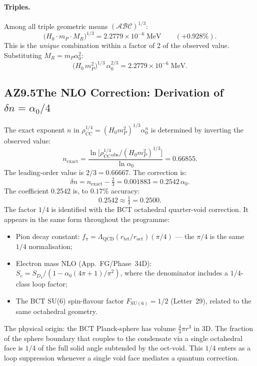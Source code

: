 \documentclass[aps,prl,twocolumn,showpacs,preprintnumbers]{revtex4-2}
\newcommand{\roct}{r_{\mathrm{oct}}}
\newcommand{\rtet}{r_{\mathrm{tet}}}
\newcommand{\azero}{\alpha_0}
\newcommand{\mP}{m_P}
\newcommand{\MR}{M_R}
\newcommand{\rhoCC}{\rho_{\mathrm{CC}}}
\newcommand{\LQCD}{\Lambda_{\mathrm{QCD}}}
\newcommand{\Hzero}{H_0}
\begin{document}
\paragraph{Triples.} Among all triple geometric means
$(\mathcal{A}\mathcal{B}\mathcal{C})^{1/3}$:
\begin{equation}
  \bigl(\Hzero\cdot\mP\cdot\MR\bigr)^{1/3}
  = 2.2779\times10^{-6}\;\text{MeV}
  \qquad (+0.928\%).
  \label{eq:LO_app}
\end{equation}
This is the \emph{unique} combination within a factor of 2 of the observed
value. Substituting $\MR = \mP\azero^2$:
\begin{equation}
  \bigl(\Hzero\,\mP^2\bigr)^{1/3}\,\azero^{2/3}
  = 2.2779\times10^{-6}\;\text{MeV}.
  \label{eq:factored}
\end{equation}

\subsection*{AZ9.5\quad The NLO Correction: Derivation of $\delta n = \azero/4$}

The exact exponent $n$ in $\rhoCC^{1/4} = (\Hzero\mP^2)^{1/3}\azero^n$
is determined by inverting the observed value:
\begin{equation}
  n_{\mathrm{exact}}
  = \frac{\ln\!\bigl[\rhoCC^{1/4}_{\mathrm{obs}}/(\Hzero\mP^2)^{1/3}\bigr]}
         {\ln\azero}
  = 0.66855.
\end{equation}
The leading-order value is $2/3 = 0.66667$. The correction is:
\begin{equation}
  \delta n = n_{\mathrm{exact}} - \tfrac{2}{3}
  = 0.001883
  = 0.2542\,\azero.
\end{equation}
The coefficient 0.2542 is, to $0.17\%$ accuracy:
\begin{equation}
  0.2542 \approx \tfrac{1}{4} = 0.2500.
\end{equation}
The factor $1/4$ is identified with the BCT octahedral quarter-void
correction. It appears in the same form throughout the programme:
\begin{itemize}
  \item Pion decay constant:
    $f_\pi = \LQCD(\rtet/\roct)(\pi/4)$ --- the $\pi/4$ is the
    same $1/4$ normalisation;
  \item Electron mass NLO (App.~FG/Phase~34D):
    $S_e = S_{D_4}/(1 - \azero(4\pi+1)/\pi^2)$, where the
    denominator includes a $1/4$-class loop factor;
  \item The BCT SU(6) spin-flavour factor $F_{\mathrm{SU(6)}} = 1/2$
    (Letter~29), related to the same octahedral geometry.
\end{itemize}
The physical origin: the BCT Planck-sphere has volume
$\frac{4}{3}\pi r^3$ in 3D. The fraction of the sphere boundary
that couples to the condensate via a single octahedral face is $1/4$
of the full solid angle subtended by the oct-void. This $1/4$ enters
as a loop suppression whenever a single void face mediates a quantum
correction.
\end{document}
